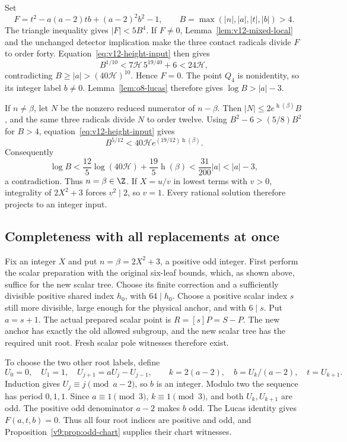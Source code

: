 Set
\[
 F=t^2-a(a-2)tb+(a-2)^2b^2-1,\qquad
 B=\max(|n|,|a|,|t|,|b|)>4.
\]
The triangle inequality gives $|F|<5B^4$.  If $F\ne0$,
Lemma~\ref{lem:v12-mixed-local} and the unchanged detector implication
make the three contact radicals divide $F$ to order forty.
Equation~\eqref{eq:v12-height-input} then gives
\[
 B^{1/10}<7\mathcal H\,5^{19/40}+6<24\mathcal H,
\]
contradicting $B\ge|a|>(40\mathcal H)^{10}$.  Hence $F=0$.
The point $Q_4$ is nonidentity, so its integer label $b\ne0$.
Lemma~\ref{lem:o8-lucas} therefore gives $\log B>|a|-3$.

If $n\ne\beta$, let $N$ be the nonzero reduced numerator of
$n-\beta$.  Then $|N|\le2e^{\operatorname h(\beta)}B$, and the same
three radicals divide $N$ to order twelve.  Using
$B^2-6>(5/8)B^2$ for $B>4$, equation~\eqref{eq:v12-height-input}
gives
\[
 B^{5/12}<40\mathcal H e^{(19/12)\operatorname h(\beta)}.
\]
Consequently
\[
 \log B<\frac{12}{5}\log(40\mathcal H)
            +\frac{19}{5}\operatorname h(\beta)
       <\frac{31}{200}|a|<|a|-3,
\]
a contradiction.  Thus $n=\beta\in\Z$.  If $X=u/v$ in lowest terms
with $v>0$, integrality of $2X^2+3$ forces $v^2\mid2$, so $v=1$.
Every rational solution therefore projects to an integer input.

\subsection{Completeness with all replacements at once}
\label{subsec:v12-completeness}

Fix an integer $X$ and put $n=\beta=2X^2+3$, a positive odd integer.
First perform the scalar preparation with the original six-leaf
bounds, which, as shown above, suffice for the new scalar tree.
Choose its finite correction and a sufficiently divisible positive
shared index $h_0$, with $64\mid h_0$.  Choose a positive scalar index
$s$ still more divisible, large enough for the physical anchor, and
with $6\mid s$.  Put $a=s+1$.  The actual prepared scalar point is
$R=[s]P=S-P$.  The new anchor has exactly the old allowed subgroup,
and the new scalar tree has the required unit root.  Fresh scalar
pole witnesses therefore exist.

To choose the two other root labels, define
\[
 U_0=0,\quad U_1=1,\quad U_{j+1}=aU_j-U_{j-1},\qquad
 k=2(a-2),\quad b=U_k/(a-2),\quad t=U_{k+1}.
\]
Induction gives $U_j\equiv j\pmod{a-2}$, so $b$ is an integer.
Modulo two the sequence has period $0,1,1$.  Since $a\equiv1\pmod3$,
$k\equiv1\pmod3$, and both $U_k,U_{k+1}$ are odd.  The positive odd
denominator $a-2$ makes $b$ odd.  The Lucas identity gives
$F(a,t,b)=0$.  Thus all four root indices are positive and odd, and
Proposition~\ref{v9:prop:odd-chart} supplies their chart witnesses.

